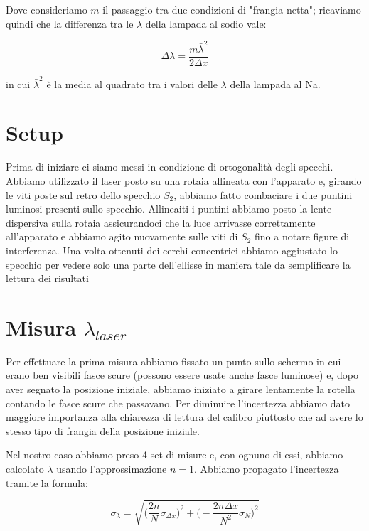 \documentclass{article}
\begin{document}
Dove consideriamo $m$ il passaggio tra due condizioni di "frangia netta"; ricaviamo quindi che la differenza tra le $\lambda$ della lampada al sodio vale:

\begin{equation} 
\Delta{\lambda} = \frac{m \bar \lambda^2}{2 \Delta{x}} 
\end{equation}

in cui $ \bar \lambda^2$ è la media al quadrato tra i valori delle $\lambda$ della lampada al Na.




\section{Setup}
Prima di iniziare ci siamo messi in condizione di ortogonalità degli specchi. Abbiamo utilizzato il laser posto su una rotaia allineata con l'apparato e, girando le viti poste sul retro dello specchio $S_2$, abbiamo fatto combaciare i due puntini luminosi presenti sullo specchio. Allineaiti i puntini abbiamo posto la lente dispersiva sulla rotaia assicurandoci che la luce arrivasse correttamente all'apparato e abbiamo agito nuovamente sulle viti di $S_2$ fino a notare figure di interferenza. Una volta ottenuti dei cerchi concentrici abbiamo aggiustato lo specchio per vedere solo una parte dell'ellisse in maniera tale da semplificare la lettura dei risultati




\section{Misura $\lambda_{laser}$}
Per effettuare la prima misura abbiamo fissato un punto sullo schermo in cui erano ben visibili fasce scure (possono essere usate anche fasce luminose) e, dopo aver segnato la posizione iniziale, abbiamo iniziato a girare lentamente la rotella contando le fasce scure che passavano. Per diminuire l'incertezza abbiamo dato maggiore importanza alla chiarezza di lettura del calibro piuttosto che ad avere lo stesso tipo di frangia della posizione iniziale.

Nel nostro caso abbiamo preso 4 set di misure e, con ognuno di essi, abbiamo calcolato $\lambda$ usando l'approssimazione $n = 1$. Abbiamo propagato l'incertezza tramite la formula:

\begin{equation} 
\sigma_\lambda= \sqrt{\bigg(\frac{2 n}{N} \sigma_{\Delta x}\bigg)^2 + \bigg({-} \frac{2 n \Delta x}{N^2} \sigma_N\bigg)^2}
\end{equation}
\end{document}
